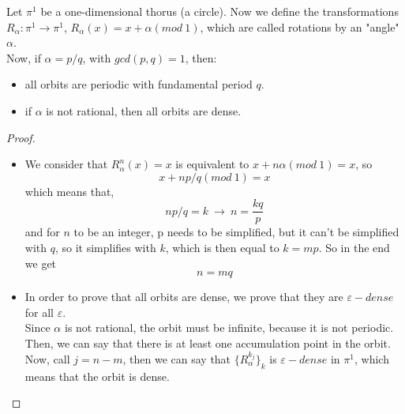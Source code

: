 Let $\pi^1$ be a one-dimensional thorus (a circle). Now we define the transformations $R_\alpha : \pi^1 \rightarrow \pi^1$, $R_\alpha(x) = x + \alpha (mod \ 1)$, which are called rotations by an "angle" $\alpha$. \\
Now, if $\alpha = p/q$, with $gcd(p,q)=1$, then:
\begin{itemize}
	\item all orbits are periodic with fundamental period $q$. 
	\item if $\alpha$ is not rational, then all orbits are dense. 
\end{itemize}
\begin{proof}
	\begin{itemize}
		\item We consider that $R^n_\alpha(x)=x$ is equivalent to $x + n\alpha (mod \ 1) = x$, so 
		$$ x + np/q (mod \ 1) = x
		$$
		which means that, 
		$$
			np/q = k \ \longrightarrow	\ n = \frac{kq}{p}
		$$
		and for $n$ to be an integer, p needs to be simplified, but it can't be simplified with $q$, so it simplifies with $k$, which is then equal to $k = mp$. So in the end we get
		$$
			n = mq
		$$
		\item In order to prove that all orbits are dense, we prove that they are $\varepsilon-dense$ for all $\varepsilon$. \\
		Since $\alpha$ is not rational, the orbit must be infinite, because it is not periodic. Then, we can say that there is at least one accumulation point in the orbit. \\
		Now, call $j = n - m$, then we can say that $\{R^{k_j}_\alpha\}_k$ is $\varepsilon-dense$ in $\pi^1$, which means that the orbit is dense.
	\end{itemize}
\end{proof}
